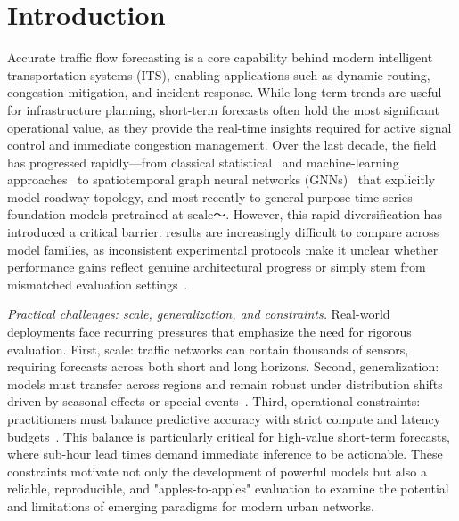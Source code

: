 \documentclass[10pt]{article}
\begin{document}
\section{Introduction}
\label{sec:introduction}

Accurate traffic flow forecasting is a core capability behind modern intelligent transportation systems (ITS), enabling applications such as dynamic routing, congestion mitigation, and incident response. While long-term trends are useful for infrastructure planning, short-term forecasts often hold the most significant operational value, as they provide the real-time insights required for active signal control and immediate congestion management\cite{cao2020spectral, liu2023largest}. Over the last decade, the field has progressed rapidly---from classical statistical~\cite{AhmedCook1979BoxJenkins, KarlaftisVlahogianni2011StatsVsNN} and machine-learning approaches~\cite{WilliamsHoel2003SeasonalARIMA, SmithWilliamsOswald2002ParamNonparam} to spatiotemporal graph neural networks (GNNs)~\cite{10.1145/3783987, li2021spatial, choi2022graph, lan2022dstagnn} that explicitly model roadway topology, and most recently to general-purpose time-series foundation models pretrained at scale～\cite{ansarichronos, woo2024moirai,cao2024tempo}. However, this rapid diversification has introduced a critical barrier: results are increasingly difficult to compare across model families, as inconsistent experimental protocols make it unclear whether performance gains reflect genuine architectural progress or simply stem from mismatched evaluation settings~\cite{liu2023we, manibardo2021deep, zeng2023transformers}.

\textit{Practical challenges: scale, generalization, and constraints.}
Real-world deployments face recurring pressures that emphasize the need for rigorous evaluation. First, {scale}: traffic networks can contain thousands of sensors, requiring forecasts across both short and long horizons\cite{liu2023largest,fhwa_pems}. Second, {generalization}: models must transfer across regions and remain robust under distribution shifts driven by seasonal effects or special events~\cite{cools2007holidays, SHAO2025105152}. Third, {operational constraints}: practitioners must balance predictive accuracy with strict compute and latency budgets~\cite{vlahogianni2014shortterm}. This balance is particularly critical for high-value short-term forecasts, where sub-hour lead times demand immediate inference to be actionable. These constraints motivate not only the development of powerful models but also a reliable, reproducible, and "apples-to-apples" evaluation to examine the potential and limitations of emerging paradigms for modern urban networks.
\end{document}
